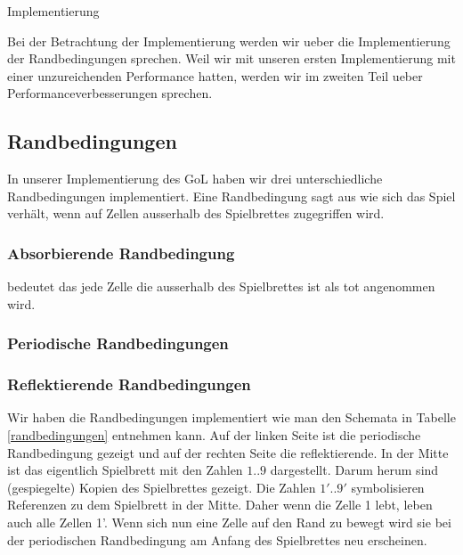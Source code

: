\documentclass[runningheads]{llncs}
\begin{document}
\begin{section}{Implementierung}
    
    Bei der Betrachtung der Implementierung werden wir ueber die Implementierung der Randbedingungen sprechen.
    Weil wir mit unseren ersten Implementierung mit einer unzureichenden Performance hatten,
    werden wir im zweiten Teil ueber Performanceverbesserungen sprechen.
   
    

    \subsection{Randbedingungen}
        In unserer Implementierung des GoL haben wir drei unterschiedliche Randbedingungen implementiert.
        Eine Randbedingung sagt aus wie sich das Spiel verhält, wenn auf Zellen ausserhalb des Spielbrettes zugegriffen wird.
        
        \subsubsection{Absorbierende Randbedingung} bedeutet das jede Zelle die ausserhalb des Spielbrettes ist als tot angenommen wird.
        
        \subsubsection{Periodische Randbedingungen} 

        \subsubsection{Reflektierende Randbedingungen}

        Wir haben die Randbedingungen implementiert wie man den Schemata in Tabelle \ref{randbedingungen} entnehmen kann.
        Auf der linken Seite ist die periodische Randbedingung gezeigt und auf der rechten Seite die reflektierende.
        In der Mitte ist das eigentlich Spielbrett mit den Zahlen $1..9$ dargestellt.
        Darum herum sind (gespiegelte) Kopien des Spielbrettes gezeigt.
        Die Zahlen $1'..9'$ symbolisieren Referenzen zu dem Spielbrett in der Mitte.
        Daher wenn die Zelle 1 lebt, leben auch alle Zellen 1'.
        Wenn sich nun eine Zelle auf den Rand zu bewegt wird sie bei der periodischen Randbedingung am Anfang des Spielbrettes neu erscheinen.



\end{section}
\end{document}
